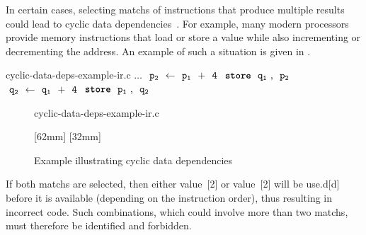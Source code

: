 In certain cases, selecting \glspl{match} of \glspl{instruction} that produce
multiple results could lead to cyclic data dependencies~\cite{EbnerEtAl:2008}.
%
For example, many modern processors provide memory \glspl{instruction} that load
or store a value while also incrementing or decrementing the address.
%
An example of such a situation is given in .
%
\begin{filecontents*}{cyclic-data-deps-example-ir.c}
$\ldots$
$\irAssign{\irVar{p}[2]}{\irAdd{\irVar{p}[1]}{\irVar{4}}}$
$\irStore{\irVar{q}[1]}{\irVar{p}[2]}$
$\irAssign{\irVar{q}[2]}{\irAdd{\irVar{q}[1]}{\irVar{4}}}$
$\irStore{\irVar{p}[1]}{\irVar{q}[2]}$
\end{filecontents*}%
%
\begin{figure}
                {%
                  \begin{lstpage}{22mm}%
                                    {cyclic-data-deps-example-ir.c}%
                  \end{lstpage}%
                }%
  \hfill%
                [62mm]%
                {%
                }%
  \hfill%
                [32mm]%
                {%
                }

  \caption{Example illustrating cyclic data dependencies}%
\end{figure}
%
If both \glspl{match} are selected, then either value~[2] or
value~[2] will be \gls{use.d}[d] before it is available (depending on
the instruction order), thus resulting in incorrect code.
%
Such combinations, which could involve more than two \glspl{match}, must
therefore be identified and forbidden.

